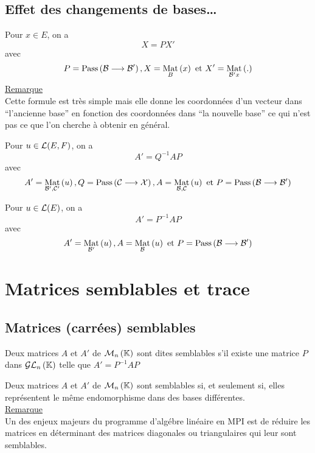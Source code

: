 \subsection{Effet des changements de bases\dots}
\begin{defprop}
    Pour \(x \in E\), on a
    \[X = P X'\]
    avec
    \[  P = \pass{\cal{B}}{\cal{B'}}, X = \Mat{B}{x}\text{ et } X' = \Mat{\cal{B'}{x}}.\]
    \underline{Remarque} \\
    Cette formule est très simple mais elle donne les coordonnées d’un vecteur dans “l’ancienne base” en fonction des coordonnées dans “la nouvelle base” ce qui n’est pas ce que l’on cherche à obtenir en général.
\end{defprop}

\begin{defprop}
    Pour \(u \in \cal{L}(E, F )\), on a
    \[A' = Q^{-1}AP\]
    avec
\[A' = \Mat{\cal{B'}, \cal{C'}}{u}, Q = \pass{\cal{C}}{\cal{X}}, A = \Mat{\cal{B}, \cal{C}}{u} \text{ et }P = \pass{\cal{B}}{\cal{B'}}\]
\end{defprop}

\begin{defprop}
    Pour \(u \in \cal{L}(E)\), on a
    \[A' = P ^{-1}AP\]
    avec
\[A' = \Mat{\cal{B'}}{u}, A = \Mat{\cal{B}}{u} \text{ et }P = \pass{\cal{B}}{\cal{B'}}\]
\end{defprop}

\section{Matrices semblables et trace}
\subsection{Matrices (carrées) semblables}
    \begin{defi}
        Deux matrices \(A\) et \(A'\) de \(\M{n}\) sont dites semblables s’il existe une matrice \(P\) dans \(\GL{n}\) telle que \(A' = P ^{-1}AP\) 
    \end{defi}
\begin{defprop}
    Deux matrices \(A\) et \(A'\) de \(\M{n}\) sont semblables si, et seulement si, elles représentent le même endomorphisme dans des bases différentes.\\
    \underline{Remarque} \\
    Un des enjeux majeurs du programme d’algébre linéaire en MPI est de réduire les matrices en déterminant des matrices diagonales ou triangulaires qui leur sont semblables.
\end{defprop}

